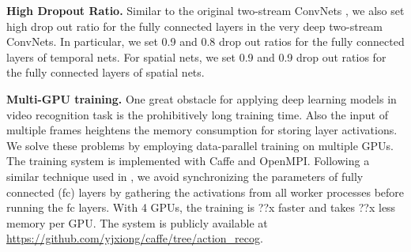 \documentclass[10pt,twocolumn,letterpaper]{article}
\begin{document}
\textbf{High Dropout Ratio.} Similar to the original two-stream ConvNets \cite{SimonyanZ14}, we also set high drop out ratio for the fully connected layers in the very deep two-stream ConvNets. In particular, we set 0.9 and 0.8 drop out ratios for the fully connected layers of temporal nets. For spatial nets, we set 0.9 and 0.9 drop out ratios for the fully connected layers of spatial nets.

\textbf{Multi-GPU training.}  One great obstacle for applying deep learning models in video recognition task is the prohibitively long training time. Also the input of multiple frames heightens the memory consumption for storing layer activations. We solve these problems by employing data-parallel training on multiple GPUs. The training system is implemented with Caffe and OpenMPI. Following a similar technique used in \cite{HeArxiv2015}, we avoid synchronizing the parameters of fully connected (fc) layers by gathering the activations from all worker processes before running the fc layers. With 4 GPUs, the training is ??x faster and takes ??x less memory per GPU. The system is publicly available at \url{https://github.com/yjxiong/caffe/tree/action_recog}.

\begin{table*}
\begin{center}
\vspace{2mm}
\caption{Performance comparison of different architectures on the UCF101 dataset.}
\label{tbl:result_ucf}
\end{center}
\end{table*}
\end{document}
